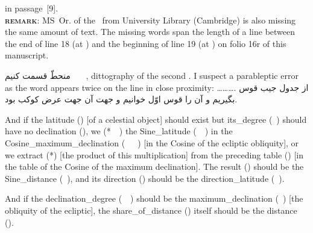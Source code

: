 {{\begin{itemize}
 in  passage~[9].\\[5pt]
\textbf{\scshape remark}: MS~Or. of the \ZijUlughBeg\ from  University Library (Cambridge) is also missing the same amount of text. The missing words  span the length of a line between the end of line 18 (at ) %
and the beginning of line 19 (at ) on folio 16r of this manuscript.\label{zij_ulugh_beg_missing_line}
\end{itemize}\vspace{-\topsep}
} %
منحطّ قسمت کنیم %
%
{~\te{$\Big ]$}~~\SjB, dittography of the second . %
I suspect a parableptic error as the word  %
appears twice on the line in close proximity: 
\dots\thinspace {}\thinspace\dots\thinspace{}\thinspace\dots\thinspace.\label{wrap_footnote_example}}
از جدول جيب قوس بگیریم و آن را قوس اوّل خوانیم  و جهت آن جهت عرض کوکب بود.\hfill}

\clearpage{}

\noindent\reversemarginpar{}%
And if the \gls{latitude} (\ard) [of a celestial object] should exist but \gls{its_degree} (\daraji\idafavowel\ \uy)  should have no \gls{declination}  (\mayl), we   (*\munhatt\idafaconsonant\ \darb\ \kardan) the \gls{Sine_latitude} (\jayb\idafaconsonant\ \ard\idafaconsonant\ \uy) in the \gls{Cosine_maximum_declination} (\jayb\idafaconsonant\ \tamam\idafaconsonant\ \mayl\idafaconsonant\ \kulli)  [\ie  in the Cosine of the ecliptic obliquity], or we \gls{extract} (*\darardan) [the product of this multiplication] from the preceding \gls{table} (\jadval) [\ie in the table of the Cosine of the maximum declination]. The \gls{result} (\hasil) should be the \gls{Sine_distance} (\jayb\idafaconsonant\ \bud), and its \gls{direction} (\jahat) should be the \gls{direction_latitude} (\jahat\idafaconsonant\ \ard).\label{passge_6_ard_glossary_format_example}
\medskip

\noindent\reversemarginpar{}%
And if the \gls{declination_degree} (\mayl\idafaconsonant\ \daraji\idafavowel\ \uy) should be the \gls{maximum_declination} (\mayl\idafaconsonant\ \kulli) [\ie the obliquity of the ecliptic], the \gls{share_of_distance} (\hissatalbud) itself should be the \gls{distance} (\bud). 
\\[\baselineskip]

